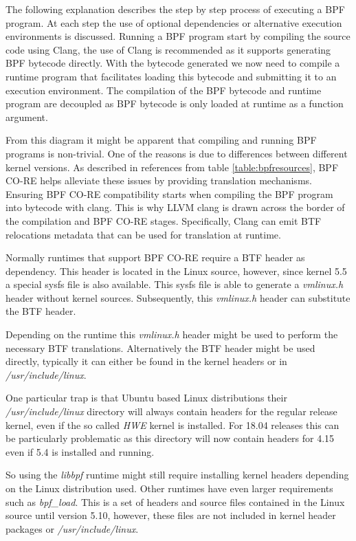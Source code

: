 \documentclass[conference]{IEEEtran}
\begin{document}
The following explanation describes the step by step process of executing a BPF
program. At each step the use of optional dependencies or alternative execution
environments is discussed. Running a BPF program start by compiling the source
code using Clang, the use of Clang is recommended as it supports
generating BPF bytecode directly. With the bytecode generated we now need to
compile a runtime program that facilitates loading this bytecode and submitting
it to an execution environment. The compilation of the BPF bytecode and runtime
program are decoupled as BPF bytecode is only loaded at runtime as a function
argument.

From this diagram it might be apparent that compiling and running BPF programs
is non-trivial. One of the reasons is due to differences between different
kernel versions. As described in references from table \ref{table:bpfresources},
BPF CO-RE helps  alleviate these issues by providing translation mechanisms.
Ensuring BPF CO-RE compatibility starts when compiling the BPF program into
bytecode with clang. This is why LLVM clang is drawn across the border of the
compilation and BPF CO-RE stages. Specifically, Clang can emit BTF relocations
metadata that can be used for translation at runtime.

Normally runtimes that support BPF CO-RE require a BTF header as dependency.
This header is located in the Linux source, however, since kernel 5.5 a special
sysfs file is also available. This sysfs file is able to generate a
\textit{vmlinux.h} header without kernel sources. Subsequently,
this \textit{vmlinux.h} header can substitute the BTF header.

Depending on the runtime this \textit{vmlinux.h} header might be used to
perform the necessary BTF translations. Alternatively the BTF header might be
used directly, typically it can either be found in the kernel headers or in
\textit{/usr/include/linux}.

One particular trap is that Ubuntu based Linux
distributions their \textit{/usr/include/linux} directory will always contain
headers for the regular release kernel, even if the so called \textit{HWE}
kernel is installed. For 18.04 releases this can be particularly problematic as
this directory will now contain headers for 4.15 even if 5.4 is installed and
running.

So using the \textit{libbpf} runtime might still require installing kernel
headers depending on the Linux distribution used. Other runtimes have even
larger requirements such as \textit{bpf\_load}. This is a set of headers and
source files contained in the Linux source until version 5.10, however, these
files are not included in kernel header packages or \textit{/usr/include/linux}.
\end{document}
